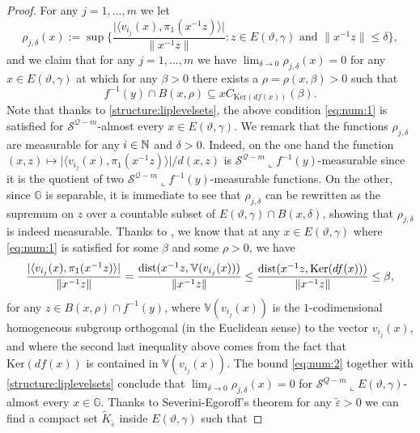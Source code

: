 \documentclass[10pt, a4paper,
oneside, headinclude,footinclude]{scrartcl}
\begin{document}
\begin{proof}
For any $j=1,\ldots,m$ we let
$$\rho_{j,\delta}(x):=\sup\bigg\{ \frac{\lvert\langle v_{i_j}(x),\pi_1(x^{-1}z)\rangle\rvert}{\lVert x^{-1}z\rVert}:z\in E(\vartheta,\gamma)\text{ and }\lVert x^{-1}z\rVert\leq \delta\bigg\},$$
and we claim that for any $j=1,\ldots,m$ we have $\lim_{\delta\to 0}\rho_{j,\delta}(x)=0$ for any $x\in E(\vartheta,\gamma)$ at which for any $\beta>0$ there exists a $\rho=\rho(x,\beta)>0$ such that 
\begin{equation}
    f^{-1}(y)\cap B(x,\rho)\subseteq xC_{\mathrm{Ker}(df(x))}(\beta).
    \label{eq:num:1}
\end{equation}
Note that thanks to \cref{structure:liplevelsets}, the above condition \eqref{eq:num:1} is satisfied for $\mathcal{S}^{\mathcal{Q}-m}$-almost every $x\in E(\vartheta,\gamma)$. We remark that the functions $\rho_{j,\delta}$ are measurable for any $i\in\mathbb{N}$ and $\delta>0$. Indeed, on the one hand the function $(x,z)\mapsto\lvert \langle v_{i_j}(x),\pi_1(x^{-1}z)\rangle\rvert/d(x,z)$ is $\mathcal{S}^{\mathcal{Q}-m}\llcorner f^{-1}(y)$-measurable since it is the quotient of two $\mathcal{S}^{\mathcal{Q}-m}\llcorner f^{-1}(y)$-measurable functions. On the other, since $\mathbb{G}$ is separable, it is immediate to see that $\rho_{j,\delta}$ can be rewritten as the supremum on $z$ over a countable subset of $E(\vartheta,\gamma)\cap B(x,\delta)$, showing that $\rho_{j,\delta}$ is indeed measurable. Thanks to \cite[Proposition 1.5]{MarstrandMattila20}, we know that at any $x\in E(\vartheta,\gamma)$ where \eqref{eq:num:1} is satisfied for some $\beta$ and some $\rho>0$, we have
\begin{equation}
\begin{split}
        \frac{\lvert\langle v_{i_j}(x),\pi_1(x^{-1}z)\rangle\rvert}{\lVert x^{-1}z\rVert}=\frac{\operatorname*{dist}(x^{-1}z,\mathbb{V}(v_{i_j}(x)))}{\lVert x^{-1}z\rVert}\leq \frac{\operatorname*{dist}(x^{-1}z,\mathrm{Ker}(df(x)))}{\lVert x^{-1}z\rVert}\leq \beta,
        \label{eq:num:2}
\end{split}
\end{equation}
for any $z\in B(x,\rho)\cap f^{-1}(y)$, where $\mathbb{V}(v_{i_j}(x))$ is the $1$-codimensional homogeneous subgroup orthogonal (in the Euclidean sense) to the vector $v_{i_j}(x)$, and where the second last inequality above comes from the fact that $\mathrm{Ker}(df(x))$ is contained in $\mathbb{V}(v_{i_j}(x))$.
The bound \eqref{eq:num:2} together with \cref{structure:liplevelsets} conclude that $\lim_{\delta\to 0}\rho_{j,\delta}(x)=0$ for $\mathcal{S}^{Q-m}\llcorner E(\vartheta,\gamma)$-almost every $x\in\mathbb{G}$. Thanks to Severini-Egoroff's theorem for any $\tilde \varepsilon>0$ we can find a compact set $\tilde K_{\tilde \varepsilon}$ inside $E(\vartheta,\gamma)$ such that

\end{proof}
\end{document}
